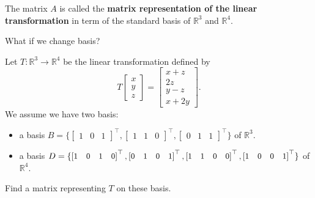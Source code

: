 \documentclass[20pt,a4paper]{extarticle}
\newcommand{\ra}{\rightarrow}
\newcounter{example}
\begin{document}
	The matrix $A$ is called the \textbf{matrix representation of the linear transformation} in term of the standard basis of $\mathbb{R}^3$ and $\mathbb{R}^4$. 

	What if we change basis?

		
	\newpage 

	\begin{example}
	Let $T : \mathbb{R}^3 \ra \mathbb{R}^4$ be the linear transformation defined by
		\[
			T \begin{bmatrix} x \\ y \\ z \end{bmatrix} = \begin{bmatrix} x + z \\ 2z \\ y - z\\  x + 2y \end{bmatrix}.
		\]
	We assume we have two basis:
		\begin{itemize}[label=\textbullet]
			\item a basis $B = \{ \begin{bmatrix} 1 & 0 & 1 \end{bmatrix}^\top , \begin{bmatrix} 1 & 1 & 0 \end{bmatrix}^\top , \begin{bmatrix} 0 & 1 & 1 \end{bmatrix}^\top \}$ of $\mathbb{R}^3$.
			\item a basis $D = {\small \{ \begin{bmatrix} 1 & 0 & 1 & 0 \end{bmatrix}^\top , \begin{bmatrix} 0 & 1 & 0 & 1 \end{bmatrix}^\top , \begin{bmatrix} 1 & 1 & 0 & 0 \end{bmatrix}^\top, \begin{bmatrix} 1 & 0 & 0& 1 \end{bmatrix}^\top }\}$ of $\mathbb{R}^4$.
		\end{itemize}
	Find a matrix representing $T$ on these basis. 
	\end{example}

	\begin{solution}

	\end{solution}

	\newpage 

	\phantom{2}
\end{document}
